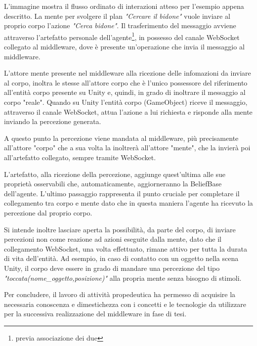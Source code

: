 L'immagine mostra il flusso ordinato di interazioni atteso per l'esempio appena descritto. La mente per svolgere il plan \textit{"Cercare il bidone"} vuole inviare al proprio corpo l'azione \textit{"Cerca bidone"}. Il trasferimento del messaggio avviene attraverso l'artefatto personale dell'agente\footnote{previa associazione dei due}, in possesso del canale WebSocket collegato al middleware, dove è presente un'operazione che invia il messaggio al middleware.

\medskip 

L'attore mente presente nel middleware alla ricezione delle infomazioni da inviare al corpo, inoltra le stesse all'attore corpo che è l'unico possessore del riferimento all'entità corpo presente su Unity e, quindi, in grado di inoltrare il messaggio al corpo "reale". Quando su Unity l'entità corpo (GameObject) riceve il messaggio, attraverso il canale WebSocket, attua l'azione a lui richiesta e risponde alla mente inviando la percezione generata.

\medskip

A questo punto la percezione viene mandata al middleware, più precisamente all'attore "corpo" che a sua volta la inoltrerà all'attore "mente", che la invierà poi all'artefatto collegato, sempre tramite WebSocket.

\medskip

L'artefatto, alla ricezione della percezione, aggiunge quest'ultima alle sue proprietà osservabili che, automaticamente, aggiorneranno la BeliefBase dell'agente. L'ultimo passaggio rappresenta il punto cruciale per completare il collegamento tra corpo e mente dato che in questa maniera l'agente ha ricevuto la percezione dal proprio corpo. 

\medskip

Si intende inoltre lasciare aperta la possibilità, da parte del corpo, di inviare percezioni non come reazione ad azioni eseguite dalla mente, dato che il collegamento WebSocket, una volta effettuato, rimane attivo per tutta la durata di vita dell'entità. Ad esempio, in caso di contatto con un oggetto nella scena Unity, il corpo deve essere in grado di mandare una percezione del tipo \textit{"toccata(nome\_oggetto,posizione)"} alla propria mente senza bisogno di stimoli.

\medskip

Per concludere, il lavoro di attività propedeutica ha permesso di acquisire la necessaria conoscenza e dimestichezza con i concetti e le tecnologie da utilizzare per la successiva realizzazione del middleware in fase di tesi.
 